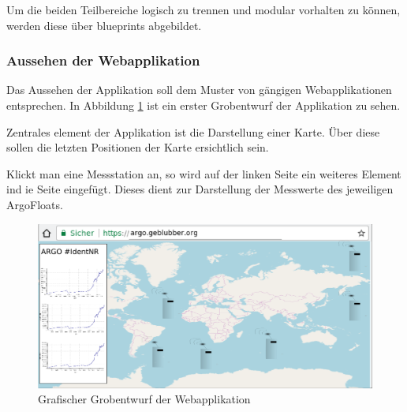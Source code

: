 Um die beiden Teilbereiche logisch zu trennen und modular vorhalten zu können, werden diese über blueprints abgebildet.



\subsubsection{Aussehen der Webapplikation}
%
%

Das Aussehen der Applikation soll dem Muster von gängigen Webapplikationen entsprechen. In Abbildung \ref{fig:entwurf_webseite} ist ein erster Grobentwurf der Applikation zu sehen.

Zentrales element der Applikation ist die Darstellung einer Karte. Über diese sollen die letzten Positionen der Karte ersichtlich sein.


Klickt man eine Messstation an, so wird auf der linken Seite ein weiteres Element ind ie Seite eingefügt. Dieses dient zur Darstellung der Messwerte des jeweiligen ArgoFloats.



\begin{figure}[h!]
    \centering
    \includegraphics[width=\textwidth]{pix/EntwurfWebseite.png}
    \caption{Grafischer Grobentwurf der Webapplikation}
    \label{fig:entwurf_webseite}
\end{figure}

